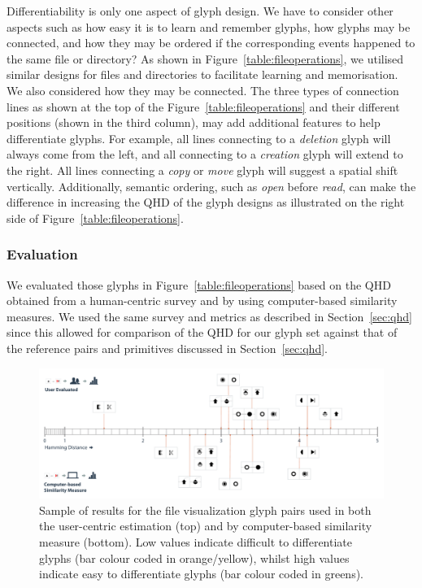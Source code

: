 Differentiability is only one aspect of glyph design.
We have to consider other aspects such as how easy it is to learn and remember glyphs, how glyphs may be connected, and how they may be ordered if the corresponding events happened to the same file or directory?
As shown in Figure~\ref{table:fileoperations}, we utilised similar designs for files and directories to facilitate learning and memorisation.
We also considered how they may be connected.
The three types of connection lines as shown at the top of the Figure~\ref{table:fileoperations} and their different positions (shown in the third column), may add additional features to help differentiate glyphs.
For example, all lines connecting to a \emph{deletion} glyph will always come from the left, and all connecting to a \emph{creation} glyph will extend to the right.
All lines connecting a \emph{copy} or \emph{move} glyph will suggest a spatial shift vertically.
Additionally, semantic ordering, such as \emph{open} before \emph{read}, can make the difference in increasing the QHD of the glyph designs as illustrated on the right side of Figure~\ref{table:fileoperations}.

\subsubsection{Evaluation}
\label{sec:eval_glyphs}

We evaluated those glyphs in Figure~\ref{table:fileoperations} based on the QHD obtained from a human-centric survey and by using computer-based similarity measures.
We used the same survey and metrics as described in Section~\ref{sec:qhd} since this allowed for comparison of the QHD for our glyph set against that of the reference pairs and primitives discussed in Section~\ref{sec:qhd}.

\begin{figure}[b!]
\begin{center}
\includegraphics[width=\textwidth]{images/filesystem/Comparison_ourglyphs}
\end{center}
\caption{Sample of results for the file visualization glyph pairs used in both the user-centric estimation (top) and by computer-based similarity measure (bottom).
Low values indicate difficult to differentiate glyphs (bar colour coded in orange/yellow), whilst high values indicate easy to differentiate glyphs (bar colour coded in greens).}
\label{fig:our_glyph_scores}
\end{figure}


